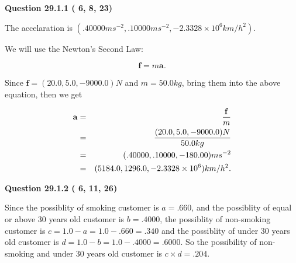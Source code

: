 \documentclass[12pt]{article}
\begin{document}
{\textbf{\Large{Question
29.1.1 
 (          6,          8,         23)
}}}
  
  
 
 
\noindent{}
 
 
The accelaration is
$(
.40000ms^{-2},
.10000ms^{-2},
-2.3328 \times 10^{6}km/h^2
).
$
 
 
 
 
 
 
\noindent{}

We will use the Newton's Second Law:
 
\[
\mathbf{f}=m\mathbf{a}.
\]
 
Since $\mathbf{f}=( %
20.0,  %
5.0,  %
-9000.0 )N$
and $m= %
50.0kg$, bring them into the above equation, then we get
 
\begin{eqnarray*}
\mathbf{a}&=&\frac{\mathbf{f}}m  \\
&=&\frac{(
20.0 ,
5.0 ,
-9000.0 )N
}{ %
50.0 kg}  \\
&=&(
.40000 ,
.10000,
-180.00
)ms^{-2} \\
&=&(
5184.0 ,
1296.0 ,
-2.3328 \times 10^{6}
)km/h^2.
\end{eqnarray*}
 
 
 
  
\vspace{0.2in}
  
{\textbf{\Large{Question
29.1.2 
 (          6,         11,         26)
}}}
  
  
 
 
\noindent{}

Since the possiblity of  %
smoking customer is $ a =  %
.660 $,
and the possiblity of  %
equal or above 30 years old customer is $ b =  %
.4000 $,
the possiblity of  %
non-smoking customer is $ c = 1.0 - a = 1.0 -
.660
=  %
.340 $ and the possiblity of  %
under 30 years old
customer is $ d = 1.0 - b = 1.0 -  %
.4000 =  %
.6000  $.
So the possibility of  %
 non-smoking and  %
under 30 years old
customer is $ c \times d =  %
.204 $.
 
 
 
 
 
\noindent{}
\end{document}
